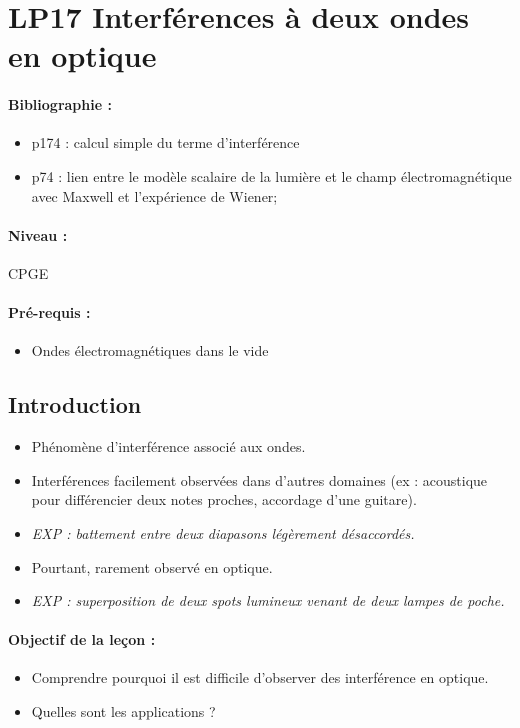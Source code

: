 \section{LP17 Interférences à deux ondes en optique}

\paragraph{Bibliographie :}
\begin{itemize}
\item \cite{BFROptique} p174 : calcul simple du terme d'interférence
\item \cite{BFROptique} p74 : lien entre le modèle scalaire de la lumière et le champ électromagnétique avec Maxwell et l'expérience de Wiener;
\end{itemize}

\paragraph{Niveau :} CPGE

\paragraph{Pré-requis :}
\begin{itemize}
\item Ondes électromagnétiques dans le vide
\end{itemize}

\subsection{Introduction}

\begin{itemize}
\item Phénomène d'interférence associé aux ondes.
\item Interférences facilement observées dans d'autres domaines (ex : acoustique pour différencier deux notes proches, accordage d'une guitare).
\item \emph{EXP : battement entre deux diapasons légèrement désaccordés.}
\item Pourtant, rarement observé en optique.
\item \emph{EXP : superposition de deux spots lumineux venant de deux lampes de poche.}
\end{itemize}

\paragraph{Objectif de la leçon :}
\begin{itemize}
\item Comprendre pourquoi il est difficile d'observer des interférence en optique.
\item Quelles sont les applications ?
\end{itemize}

